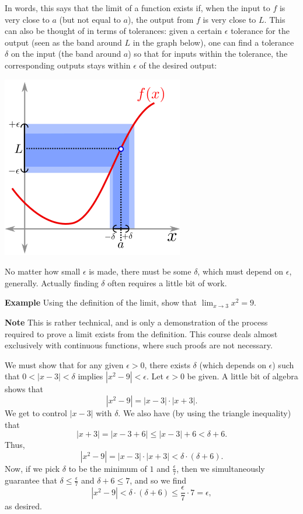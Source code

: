 \documentclass[twoside,openright,titlepage,a4paper]{book}
\begin{document}
\begin{sloppypar}
In words, this says that the limit of a function exists if, when the input to $f$ is very close to $a$ (but not equal to $a$), the output from $f$ is very close to $L$. This can also be thought of in terms of tolerances: given a certain $\epsilon$ tolerance for the output (seen as the band around $L$ in the graph below), one can find a tolerance $\delta$ on the input (the band around $a$) so that for inputs within the tolerance, the corresponding outputs stays within $\epsilon$ of the desired output:
\begin{center}\includegraphics[scale=0.6]{Limit}\end{center}

No matter how small $\epsilon$ is made, there must be some $\delta$, which must depend on $\epsilon$, generally. Actually finding $\delta$ often requires a little bit of work.

\textbf{Example} Using the definition of the limit, show that $\displaystyle \lim_{x \rightarrow 3} x^2 = 9$. 
\begin{examplebox}
\textbf{Note} This is rather technical, and is only a demonstration of the process required to prove a limit exists from the definition. This course deals almost exclusively with continuous functions, where such proofs are not necessary.

We must show that for any given $\epsilon>0$, there exists $\delta$ (which depends on $\epsilon$) such that $0<|x-3|<\delta$ implies $|x^2-9|<\epsilon$.
Let $\epsilon>0$ be given. A little bit of algebra shows that \[ |x^2-9| = |x-3| \cdot |x+3|. \]
We get to control $|x-3|$ with $\delta$. We also have (by using the triangle inequality) that \[ |x+3| = |x-3+6| \leq |x-3|+6 < \delta + 6. \]
Thus, \[ |x^2-9| = |x-3|\cdot |x+3| < \delta \cdot (\delta + 6). \]
Now, if we pick $\delta$ to be the minimum of $1$ and $\frac{\epsilon}{7}$, then we simultaneously guarantee that $\delta \leq \frac{\epsilon}{7}$ and $\delta + 6 \leq 7$, and so we find \[ |x^2-9| < \delta \cdot (\delta + 6) \leq \frac{\epsilon}{7} \cdot 7 = \epsilon, \] as desired.
\end{examplebox}


\end{sloppypar}
\end{document}
